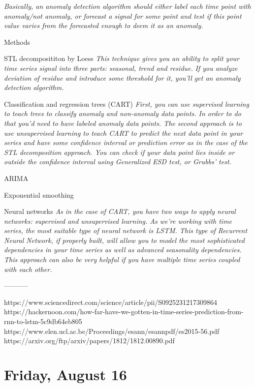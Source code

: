 \documentclass[11pt,letterpaper]{article}
\begin{document}
\textit{Basically, an anomaly detection algorithm should either label each time point with anomaly/not anomaly, or forecast a signal for some point and test if this point value varies from the forecasted enough to deem it as an anomaly.}

Methods

STL decomposititon by Loess
\textit{This technique gives you an ability to split your time series signal into three parts: seasonal, trend and residue.}
\textit{If you analyze deviation of residue and introduce some threshold for it, you’ll get an anomaly detection algorithm.}

Classification and regression trees (CART)
\textit{First, you can use supervised learning to teach trees to classify anomaly and non-anomaly data points. In order to do that you’d need to have labeled anomaly data points.
The second approach is to use unsupervised learning to teach CART to predict the next data point in your series and have some confidence interval or prediction error as in the case of the STL decomposition approach. You can check if your data point lies inside or outside the confidence interval using Generalized ESD test, or Grubbs’ test.}

ARIMA

Exponential smoothing

Neural networks
\textit{As in the case of CART, you have two ways to apply neural networks: supervised and unsupervised learning.
As we’re working with time series, the most suitable type of neural network is LSTM. This type of Recurrent Neural Network, if properly built, will allow you to model the most sophisticated dependencies in your time series as well as advanced seasonality dependencies.
This approach can also be very helpful if you have multiple time series coupled with each other.}

-----------

https://www.sciencedirect.com/science/article/pii/S0925231217309864
https://hackernoon.com/how-far-have-we-gotten-in-time-series-prediction-from-rnn-to-lstm-5c9db64eb805
https://www.elen.ucl.ac.be/Proceedings/esann/esannpdf/es2015-56.pdf
https://arxiv.org/ftp/arxiv/papers/1812/1812.00890.pdf

\section*{Friday, August 16}

\printbibliography
\end{document}
